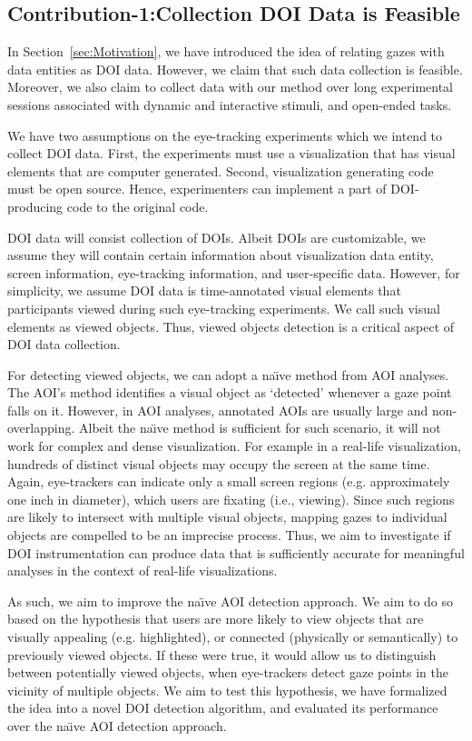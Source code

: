 \subsection{Contribution-1:Collection DOI Data is Feasible}
\label{sec:Contribution-1}
In Section~\ref{sec:Motivation}, we have introduced the idea of relating gazes with data entities as DOI data. However, we claim that such data collection is feasible. Moreover, we also claim to collect data with our method over long experimental sessions associated with dynamic and interactive stimuli, and open-ended tasks. 

We have two assumptions on the eye-tracking experiments which we intend to collect DOI data. First, the experiments must use a visualization that has visual elements that are computer generated. Second, visualization generating code must be open source. Hence, experimenters can implement a part of DOI-producing code to the original code. 

DOI data will consist collection of DOIs. Albeit DOIs are customizable, we assume they will contain certain information about visualization data entity, screen information, eye-tracking information, and user-specific data. However, for simplicity, we assume DOI data is time-annotated visual elements that participants viewed during such eye-tracking experiments. We call such visual elements as viewed objects. Thus, viewed objects detection is a critical aspect of DOI data collection.

For detecting viewed objects, we can adopt a na\"{\i}ve method from AOI analyses. The AOI's method identifies a visual object as `detected' whenever a gaze point falls on it. However, in AOI analyses, annotated AOIs are usually large and non-overlapping. Albeit the na\"{\i}ve method is sufficient for such scenario, it will not work for complex and dense visualization. For example in a real-life visualization, hundreds of distinct visual objects may occupy the screen at the same time. Again, eye-trackers can indicate only a small screen regions (e.g. approximately one inch in diameter), which users are fixating (i.e., viewing). Since such regions are likely to intersect with multiple visual objects, mapping gazes to individual objects are compelled to be an imprecise process. Thus, we aim to investigate if DOI instrumentation can produce data that is sufficiently accurate for meaningful analyses in the context of real-life visualizations.

As such, we aim to improve the na\"{\i}ve AOI detection approach. We aim to do so based on the hypothesis that users are more likely to view objects that are visually appealing (e.g. highlighted), or connected (physically or semantically) to previously viewed objects. If these were true, it would allow us to distinguish between potentially viewed objects, when eye-trackers detect gaze points in the vicinity of multiple objects. We aim to test this hypothesis, we have formalized the idea into a novel DOI detection algorithm, and evaluated its performance over the na\"{\i}ve AOI detection approach.  

